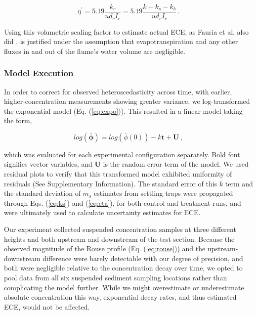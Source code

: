 \documentclass[geosciences,article,submit,moreauthors,pdftex]{Definitions/mdpi}
\begin{document}
\begin{equation}
    \eta^\prime = 5.19\frac{k_c}{ud_cI_c} = 5.19\frac{k - k_s - k_b}{ud_cI_c}\,.
    \label{eq:eta}
\end{equation}

\noindent Using this volumetric scaling factor to estimate actual ECE, as Fauria et al. also did \cite{Fauria_2015}, is justified under the assumption that evapotranspiration and any other fluxes in and out of the flume's water volume are negligible.

\subsubsection{Model Execution}

In order to correct for observed heteroscedasticity across time, with earlier, higher-concentration measurements showing greater variance, we log-transformed the exponential model (Eq. (\ref{eq:expo})). This resulted in a linear model taking the form,

\begin{equation}
    log(\boldsymbol{\bar{\phi}}) = log(\bar{\phi}(0)) - k\boldsymbol{t} + \boldsymbol{U} \,,
\end{equation}

\noindent which was evaluated for each experimental configuration separately. Bold font signifies vector variables, and $\boldsymbol{U}$ is the random error term of the model. We used residual plots to verify that this transformed model exhibited uniformity of residuals (See Supplementary Information). The standard error of this $k$ term and the standard deviation of $m_s$ estimates from settling traps were propagated through Eqs. (\ref{eq:ks}) and (\ref{eq:eta}), for both control and treatment runs, and were ultimately used to calculate uncertainty estimates for ECE.

Our experiment collected suspended concentration samples at three different heights and both upstream and downstream of the test section. Because the observed magnitude of the Rouse profile (Eq. (\ref{eq:rouse})) and the upstream-downstream difference were barely detectable with our degree of precision, and both were negligible relative to the concentration decay over time, we opted to pool data from all six suspended sediment sampling locations rather than complicating the model further. While we might overestimate or underestimate absolute concentration this way, exponential decay rates, and thus estimated ECE, would not be affected.
\end{document}
